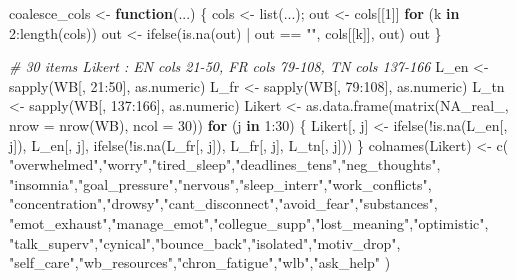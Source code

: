 \documentclass[
]{article}
\newenvironment{Shaded}{\begin{snugshade}}{\end{snugshade}}
\newcommand{\AttributeTok}[1]{\textcolor[rgb]{0.77,0.63,0.00}{#1}}
\newcommand{\CommentTok}[1]{\textcolor[rgb]{0.56,0.35,0.01}{\textit{#1}}}
\newcommand{\ConstantTok}[1]{\textcolor[rgb]{0.00,0.00,0.00}{#1}}
\newcommand{\ControlFlowTok}[1]{\textcolor[rgb]{0.13,0.29,0.53}{\textbf{#1}}}
\newcommand{\DecValTok}[1]{\textcolor[rgb]{0.00,0.00,0.81}{#1}}
\newcommand{\FunctionTok}[1]{\textcolor[rgb]{0.00,0.00,0.00}{#1}}
\newcommand{\NormalTok}[1]{#1}
\newcommand{\OtherTok}[1]{\textcolor[rgb]{0.56,0.35,0.01}{#1}}
\newcommand{\SpecialCharTok}[1]{\textcolor[rgb]{0.00,0.00,0.00}{#1}}
\newcommand{\StringTok}[1]{\textcolor[rgb]{0.31,0.60,0.02}{#1}}
\begin{document}
\begin{Shaded}
\begin{Highlighting}[]
\NormalTok{coalesce\_cols }\OtherTok{\textless{}{-}} \ControlFlowTok{function}\NormalTok{(...) \{}
\NormalTok{  cols }\OtherTok{\textless{}{-}} \FunctionTok{list}\NormalTok{(...); out }\OtherTok{\textless{}{-}}\NormalTok{ cols[[}\DecValTok{1}\NormalTok{]]}
  \ControlFlowTok{for}\NormalTok{ (k }\ControlFlowTok{in} \DecValTok{2}\SpecialCharTok{:}\FunctionTok{length}\NormalTok{(cols)) out }\OtherTok{\textless{}{-}} \FunctionTok{ifelse}\NormalTok{(}\FunctionTok{is.na}\NormalTok{(out) }\SpecialCharTok{|}\NormalTok{ out }\SpecialCharTok{==} \StringTok{""}\NormalTok{, cols[[k]], out)}
\NormalTok{  out}
\NormalTok{\}}

\CommentTok{\# 30 items Likert : EN cols 21{-}50, FR cols 79{-}108, TN cols 137{-}166}
\NormalTok{L\_en }\OtherTok{\textless{}{-}} \FunctionTok{sapply}\NormalTok{(WB[, }\DecValTok{21}\SpecialCharTok{:}\DecValTok{50}\NormalTok{], as.numeric)}
\NormalTok{L\_fr }\OtherTok{\textless{}{-}} \FunctionTok{sapply}\NormalTok{(WB[, }\DecValTok{79}\SpecialCharTok{:}\DecValTok{108}\NormalTok{], as.numeric)}
\NormalTok{L\_tn }\OtherTok{\textless{}{-}} \FunctionTok{sapply}\NormalTok{(WB[, }\DecValTok{137}\SpecialCharTok{:}\DecValTok{166}\NormalTok{], as.numeric)}
\NormalTok{Likert }\OtherTok{\textless{}{-}} \FunctionTok{as.data.frame}\NormalTok{(}\FunctionTok{matrix}\NormalTok{(}\ConstantTok{NA\_real\_}\NormalTok{, }\AttributeTok{nrow =} \FunctionTok{nrow}\NormalTok{(WB), }\AttributeTok{ncol =} \DecValTok{30}\NormalTok{))}
\ControlFlowTok{for}\NormalTok{ (j }\ControlFlowTok{in} \DecValTok{1}\SpecialCharTok{:}\DecValTok{30}\NormalTok{) \{}
\NormalTok{  Likert[, j] }\OtherTok{\textless{}{-}} \FunctionTok{ifelse}\NormalTok{(}\SpecialCharTok{!}\FunctionTok{is.na}\NormalTok{(L\_en[, j]), L\_en[, j],}
                 \FunctionTok{ifelse}\NormalTok{(}\SpecialCharTok{!}\FunctionTok{is.na}\NormalTok{(L\_fr[, j]), L\_fr[, j], L\_tn[, j]))}
\NormalTok{\}}
\FunctionTok{colnames}\NormalTok{(Likert) }\OtherTok{\textless{}{-}} \FunctionTok{c}\NormalTok{(}
  \StringTok{"overwhelmed"}\NormalTok{,}\StringTok{"worry"}\NormalTok{,}\StringTok{"tired\_sleep"}\NormalTok{,}\StringTok{"deadlines\_tens"}\NormalTok{,}\StringTok{"neg\_thoughts"}\NormalTok{,}
  \StringTok{"insomnia"}\NormalTok{,}\StringTok{"goal\_pressure"}\NormalTok{,}\StringTok{"nervous"}\NormalTok{,}\StringTok{"sleep\_interr"}\NormalTok{,}\StringTok{"work\_conflicts"}\NormalTok{,}
  \StringTok{"concentration"}\NormalTok{,}\StringTok{"drowsy"}\NormalTok{,}\StringTok{"cant\_disconnect"}\NormalTok{,}\StringTok{"avoid\_fear"}\NormalTok{,}\StringTok{"substances"}\NormalTok{,}
  \StringTok{"emot\_exhaust"}\NormalTok{,}\StringTok{"manage\_emot"}\NormalTok{,}\StringTok{"collegue\_supp"}\NormalTok{,}\StringTok{"lost\_meaning"}\NormalTok{,}\StringTok{"optimistic"}\NormalTok{,}
  \StringTok{"talk\_superv"}\NormalTok{,}\StringTok{"cynical"}\NormalTok{,}\StringTok{"bounce\_back"}\NormalTok{,}\StringTok{"isolated"}\NormalTok{,}\StringTok{"motiv\_drop"}\NormalTok{,}
  \StringTok{"self\_care"}\NormalTok{,}\StringTok{"wb\_resources"}\NormalTok{,}\StringTok{"chron\_fatigue"}\NormalTok{,}\StringTok{"wlb"}\NormalTok{,}\StringTok{"ask\_help"}
\NormalTok{)}


\end{Highlighting}
\end{Shaded}
\end{document}
